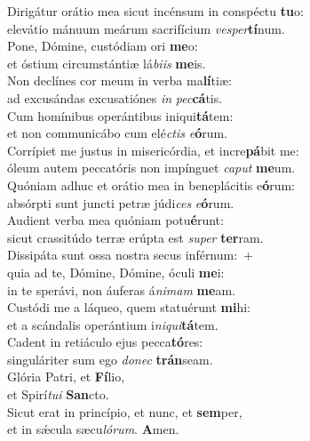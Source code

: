 \evenverse Dirigátur orátio mea sicut incénsum in conspéctu \textbf{tu}o:~\*\\
\evenverse elevátio mánuum meárum sacrifícium \textit{ve}\textit{sper}\textbf{tí}num.\\
\oddverse Pone, Dómine, custódiam ori \textbf{me}o:~\*\\
\oddverse et óstium circumstántiæ lá\textit{bi}\textit{is} \textbf{me}is.\\
\evenverse Non declínes cor meum in verba ma\textbf{lí}tiæ:~\*\\
\evenverse ad excusándas excusatiónes \textit{in} \textit{pec}\textbf{cá}tis.\\
\oddverse Cum homínibus operántibus iniqui\textbf{tá}tem:~\*\\
\oddverse et non communicábo cum elé\textit{ctis} \textit{e}\textbf{ó}rum.\\
\evenverse Corrípiet me justus in misericórdia, et incre\textbf{pá}bit me:~\*\\
\evenverse óleum autem peccatóris non impínguet \textit{ca}\textit{put} \textbf{me}um.\\
\oddverse Quóniam adhuc et orátio mea in beneplácitis e\textbf{ó}rum:~\*\\
\oddverse absórpti sunt juncti petræ júdi\textit{ces} \textit{e}\textbf{ó}rum.\\
\evenverse Audient verba mea quóniam potu\textbf{é}runt:~\*\\
\evenverse sicut crassitúdo terræ erúpta est \textit{su}\textit{per} \textbf{ter}ram.\\
\oddverse Dissipáta sunt ossa nostra secus inférnum:~+\\
\oddverse  quia ad te, Dómine, Dómine, óculi \textbf{me}i:~\*\\
\oddverse in te sperávi, non áuferas á\textit{ni}\textit{mam} \textbf{me}am.\\
\evenverse Custódi me a láqueo, quem statuérunt \textbf{mi}hi:~\*\\
\evenverse et a scándalis operántium i\textit{ni}\textit{qui}\textbf{tá}tem.\\
\oddverse Cadent in retiáculo ejus pecca\textbf{tó}res:~\*\\
\oddverse singuláriter sum ego \textit{do}\textit{nec} \textbf{trán}seam.\\
\evenverse Glória Patri, et \textbf{Fí}lio,~\*\\
\evenverse et Spirí\textit{tu}\textit{i} \textbf{San}cto.\\
\oddverse Sicut erat in princípio, et nunc, et \textbf{sem}per,~\*\\
\oddverse et in sǽcula sæcu\textit{ló}\textit{rum}. \textbf{A}men.\\
